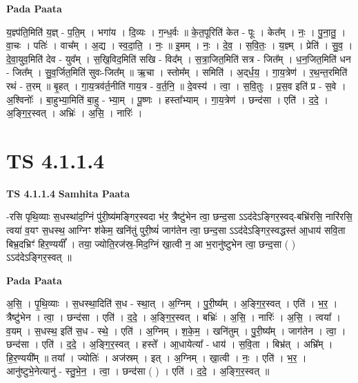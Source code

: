 \documentclass[17pt]{extarticle}
\begin{document}
\textbf{Pada Paata} \newline

य॒ज्ञ्प॑ति॒मिति॑ य॒ज्ञ् - प॒ति॒म् । भगा॑य । दि॒व्यः । ग॒न्ध॒र्वः ॥ के॒त॒पूरिति॑ केत - पूः । केत᳚म् । नः॒ । पु॒ना॒तु॒ । वा॒चः । पतिः॑ । वाच᳚म् । अ॒द्य । स्व॒दा॒ति॒ । नः॒ ॥ इ॒मम् । नः॒ । दे॒व॒ । स॒वि॒तः॒ । य॒ज्ञ्म् । प्रेति॑ । सु॒व॒ । दे॒वा॒युव॒मिति॑ देव - युव᳚म् । स॒खि॒विद॒मिति॑ सखि - विद᳚म् । स॒त्रा॒जित॒मिति॑ सत्र - जित᳚म् । ध॒न॒जित॒मिति॑ धन - जित᳚म् । सु॒व॒र्जित॒मिति॑ सुवः-जित᳚म् ॥ ऋ॒चा । स्तोम᳚म् । समिति॑ । अ॒द्‌र्ध॒य॒ । गा॒य॒त्रेण॑ । र॒थ॒न्त॒रमिति॑ रथं - त॒रम् ॥ बृ॒हत् । गा॒य॒त्रव॑र्त॒नीति॑ गाय॒त्र - व॒र्त॒नि॒ ॥ दे॒वस्य॑ । त्वा॒ । स॒वि॒तुः । प्र॒स॒व इति॑ प्र - स॒वे । अ॒श्विनोः᳚ । बा॒हुभ्या॒मिति॑ बा॒हु - भ्या॒म् । पू॒ष्णः । हस्ता᳚भ्याम् । गा॒य॒त्रेण॑ । छन्द॑सा । एति॑ । द॒दे॒ । अ॒ङ्गि॒र॒स्वत् । अभ्रिः॑ । अ॒सि॒ । नारिः॑ ।  \newline




\section*{ TS 4.1.1.4 }

\textbf{TS 4.1.1.4 } \newline
\textbf{Samhita Paata} \newline

-रसि पृथि॒व्याः स॒धस्था॑द॒ग्निं पु॑री॒ष्य॑मङ्गिर॒स्वदा भ॑र॒ त्रैष्टु॑भेन त्वा॒ छन्द॒सा ऽऽद॑देऽङ्गिर॒स्वद्-बभ्रि॑रसि॒ नारि॑रसि॒ त्वया॑ व॒यꣳ स॒धस्थ॒ आग्निꣳ श॑केम॒ खनि॑तुं पुरी॒ष्यं॑ जाग॑तेन त्वा॒ छन्द॒सा ऽऽद॑देऽङ्गिर॒स्वद्धस्त॑ आ॒धाय॑ सवि॒ता बिभ्र॒दभ्रिꣳ॑ हिर॒ण्ययीं᳚ । तया॒ ज्योति॒रज॑स्र॒-मिद॒ग्निं खा॒त्वी न॒ आ भ॒रानु॑ष्टुभेन त्वा॒ छन्द॒सा ( ) ऽऽद॑देऽङ्गिर॒स्वत् ॥ \newline

\textbf{Pada Paata} \newline

अ॒सि॒ । पृ॒थि॒व्याः । स॒धस्था॒दिति॑ स॒ध - स्था॒त् । अ॒ग्निम् । पु॒री॒ष्य᳚म् । अ॒ङ्गि॒र॒स्वत् । एति॑ । भ॒र॒ । त्रैष्टु॑भेन । त्वा॒ । छन्द॑सा । एति॑ । द॒दे॒ । अ॒ङ्गि॒र॒स्वत् । बभ्रिः॑ । अ॒सि॒ । नारिः॑ । अ॒सि॒ । त्वया᳚ । व॒यम् । स॒धस्थ॒ इति॑ स॒ध - स्थे॒ । एति॑ । अ॒ग्निम् । श॒के॒म॒ । खनि॑तुम् । पु॒री॒ष्य᳚म् । जाग॑तेन । त्वा॒ । छन्द॑सा । एति॑ । द॒दे॒ । अ॒ङ्गि॒र॒स्वत् । हस्ते᳚ । आ॒धायेत्या᳚ - धाय॑ । स॒वि॒ता । बिभ्र॑त् । अभ्रि᳚म् । हि॒र॒ण्ययी᳚म् ॥ तया᳚ । ज्योतिः॑ । अज॑स्रम् । इत् । अ॒ग्निम् । खा॒त्वी । नः॒ । एति॑ । भ॒र॒ । आनु॑ष्टुभे॒नेत्यानु॑ - स्तु॒भे॒न॒ । त्वा॒ । छन्द॑सा ( ) । एति॑ । द॒दे॒ । अ॒ङ्गि॒र॒स्वत् ॥  \newline
\end{document}
